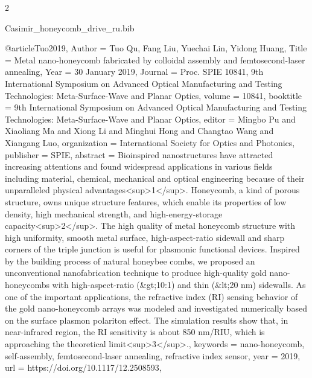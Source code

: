 \documentclass[twoside, 10pt]{article}
\def\myfilename{Casimir_honeycomb_drive_ru}
\begin{document}
\begin{multicols}{2}
\begin{filecontents}{\myfilename.bib}

@article{Tuo2019,
    Author = {Tuo Qu, Fang Liu, Yuechai Lin, Yidong Huang},
    Title = {Metal nano-honeycomb fabricated by colloidal assembly and femtosecond-laser annealing},
    Year = {30 January 2019},
    Journal = {Proc. SPIE 10841, 9th International Symposium on Advanced Optical Manufacturing and Testing Technologies: Meta-Surface-Wave and Planar Optics},
    volume = {10841},
    booktitle = {9th International Symposium on Advanced Optical Manufacturing and Testing Technologies: Meta-Surface-Wave and Planar Optics},
    editor = {Mingbo Pu and Xiaoliang Ma and Xiong Li and Minghui Hong and Changtao Wang and Xiangang Luo},
    organization = {International Society for Optics and Photonics},
    publisher = {SPIE},
    abstract = {Bioinspired nanostructures have attracted increasing attentions and found widespread applications in various fields including material, chemical, mechanical and optical engineering because of their unparalleled physical advantages<sup>1</sup>. Honeycomb, a kind of porous structure, owns unique structure features, which enable its properties of low density, high mechanical strength, and high-energy-storage capacity<sup>2</sup>. The high quality of metal honeycomb structure with high uniformity, smooth metal surface, high-aspect-ratio sidewall and sharp corners of the triple junction is useful for plasmonic functional devices. Inspired by the building process of natural honeybee combs, we proposed an unconventional nanofabrication technique to produce high-quality gold nano-honeycombs with high-aspect-ratio (&gt;10:1) and thin (&lt;20 nm) sidewalls. As one of the important applications, the refractive index (RI) sensing behavior of the gold nano-honeycomb arrays was modeled and investigated numerically based on the surface plasmon polariton effect. The simulation results show that, in near-infrared region, the RI sensitivity is about 850 nm/RIU, which is approaching the theoretical limit<sup>3</sup>.},
    keywords = {nano-honeycomb, self-assembly, femtosecond-laser annealing, refractive index sensor},
    year = {2019},
    url = {https://doi.org/10.1117/12.2508593},
}


\end{filecontents}
\end{multicols}
\end{document}
